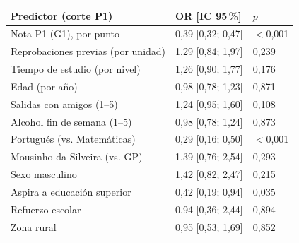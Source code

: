 \begin{tabular}{lll}
\toprule
Predictor (corte P1) & OR [IC 95\,\%] & $p$ \\
\midrule
Nota P1 (G1), por punto & 0,39 [0,32; 0,47] & $<$0,001 \\
Reprobaciones previas (por unidad) & 1,29 [0,84; 1,97] & 0,239 \\
Tiempo de estudio (por nivel) & 1,26 [0,90; 1,77] & 0,176 \\
Edad (por año) & 0,98 [0,78; 1,23] & 0,871 \\
Salidas con amigos (1–5) & 1,24 [0,95; 1,60] & 0,108 \\
Alcohol fin de semana (1–5) & 0,98 [0,78; 1,24] & 0,873 \\
Portugués (vs. Matemáticas) & 0,29 [0,16; 0,50] & $<$0,001 \\
Mousinho da Silveira (vs. GP) & 1,39 [0,76; 2,54] & 0,293 \\
Sexo masculino & 1,42 [0,82; 2,47] & 0,215 \\
Aspira a educación superior & 0,42 [0,19; 0,94] & 0,035 \\
Refuerzo escolar & 0,94 [0,36; 2,44] & 0,894 \\
Zona rural & 0,95 [0,53; 1,69] & 0,852 \\
\bottomrule
\end{tabular}
